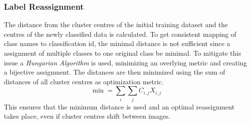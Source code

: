 \documentclass[12pt,a4paper, english,twoside]{article}
\begin{document}
    \subsubsection{Label Reassignment}\label{sec:labelassignment}
    The distance from the cluster centres of the initial training dataset and the centres of the newly classified data is calculated. 
    To get consistent mapping of class names to classification id, the minimal distance is not sufficient since a assignment of multiple classes to one original class be minimal. 
    To mitigate this issue a \textit{Hungarian Algorithm} is used, minimizing an overlying metric and creating a bijective assignment. 
    The distances are then minimized using the sum of distances of all cluster centres as optimization metric.
      \begin{equation}
        \min = \sum_{i}\sum_{j} C_{i,j}X_{i,j}
      \end{equation}
    This ensures that the minimum distance is used and an optimal reassignment takes place, even if cluster centres shift between images.
\end{document}
